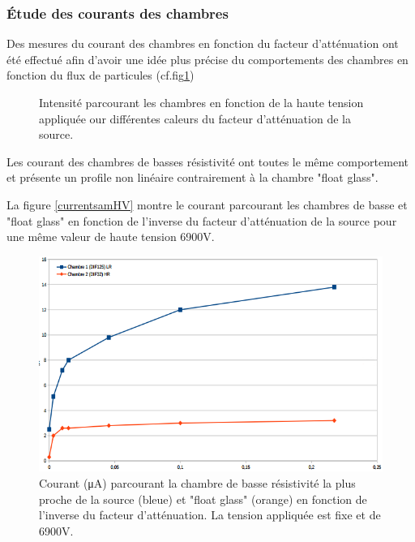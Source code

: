 \subsubsection{Étude des courants des chambres}
Des mesures du courant des chambres en fonction du facteur d'atténuation ont été effectué afin d'avoir une idée plus précise du comportements des chambres en fonction du flux de particules (cf.fig\ref{courant})

\begin{figure}[ht!]
	\centering
	\hfill
	\caption{Intensité parcourant les chambres en fonction de la haute tension appliquée our différentes caleurs du facteur d'atténuation de la source.}
	\label{courant}
\end{figure}


Les courant des chambres de basses résistivité ont toutes le même comportement et présente un profile non linéaire contrairement à la chambre "float glass".

La figure \ref{currentsamHV} montre le courant parcourant les chambres de basse et "float glass" en fonction de l'inverse du facteur d'atténuation de la source pour une même valeur de haute tension 6900V.

\begin{figure}[ht!]
	\centering
	\includegraphics[width=.6\linewidth]{GLA/current_same_HV.png}
	\caption{Courant (\si{\micro\ampere}) parcourant la chambre de basse résistivité la plus proche de la source (bleue) et "float glass" (orange) en fonction de l'inverse du facteur d'atténuation. La tension appliquée est fixe et de 6900V.}
	\label{courantsamHV}
\end{figure}

